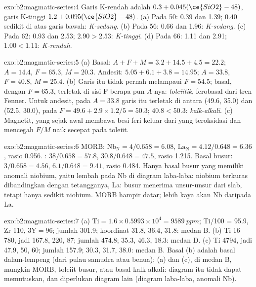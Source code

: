 \begin{solution}{exo:b2:magmatic-series:4}
Garis K-rendah adalah $0.3 + 0.045(\ce{SiO2} - 48)$, garis K-tinggi $1.2 +
0.095(\ce{SiO2} - 48)$. (a) Pada 50: 0.39 dan 1.39; $0.40$ sedikit di atas garis bawah:
\emph{K-sedang}. (b) Pada 56: 0.66 dan 1.96: \emph{K-sedang}. (c) Pada 62: 0.93 dan 2.53;
$2.90 > 2.53$: \emph{K-tinggi}. (d) Pada 66: 1.11 dan 2.91; $1.00 < 1.11$: \emph{K-rendah}.
\end{solution}

\begin{solution}{exo:b2:magmatic-series:5}
(a) Basal: $A + F + M = 3.2 + 14.5 + 4.5 = 22.2$; $A = 14.4$, $F = 65.3$, $M = 20.3$.
Andesit: $5.05 + 6.1 + 3.8 = 14.95$; $A = 33.8$, $F = 40.8$, $M = 25.4$. (b) Garis itu
tidak pernah melampaui $F = 54.5$; basal, dengan $F = 65.3$, terletak di sisi F
berapa pun $A$-nya: \emph{toleiitik}, ferobasal dari tren Fenner. Untuk
andesit, pada $A = 33.8$ garis itu terletak di antara (49.6, 35.0) dan (52.5, 30.0), pada $F =
49.6 + 2.9\times1.2/5 = 50.3$; $40.8 < 50.3$: \emph{kalk-alkali}. (c) Magnetit,
yang sejak awal membawa besi feri keluar dari  yang teroksidasi dan mencegah $F/M$
naik secepat pada toleiit.
\end{solution}

\begin{solution}{exo:b2:magmatic-series:6}
MORB: $\mathrm{Nb_N} = 4/0.658 = 6.08$, $\mathrm{La_N} = 4.12/0.648 = 6.36$, rasio
0.956. : $38/0.658 = 57.8$, $30.8/0.648 = 47.5$, rasio 1.215. Basal
busur: $3/0.658 = 4.56$, $6.1/0.648 = 9.41$, rasio 0.484. Hanya basal busur yang memiliki
anomali niobium, yaitu lembah pada Nb di diagram laba-laba: niobium terkuras dibandingkan dengan
tetangganya, La:  busur menerima unsur-unsur dari slab, tetapi hanya sedikit
niobium. MORB hampir datar;  lebih kaya
akan Nb daripada La.
\end{solution}

\begin{solution}{exo:b2:magmatic-series:7}
(a) $\mathrm{Ti} = 1.6\times0.5993\times10^4 = \qty{9589}{ppm}$; Ti/100 = 95.9, Zr
110, $3\mathrm Y = 96$; jumlah 301.9; koordinat 31.8, 36.4, 31.8: medan B. (b) Ti
16\,780, jadi 167.8, 220, 87; jumlah 474.8; 35.3, 46.3, 18.3: medan D. (c) Ti 4794, jadi
47.9, 50, 60; jumlah 157.9; 30.3, 31.7, 38.0: medan B. Basal (b) adalah basal dalam-lempeng
(dari pulau samudra atau benua); (a) dan (c), di medan B, mungkin MORB, toleiit
busur, atau basal kalk-alkali: diagram itu tidak dapat memutuskan, dan diperlukan diagram lain (diagram
laba-laba, anomali Nb).
\end{solution}

